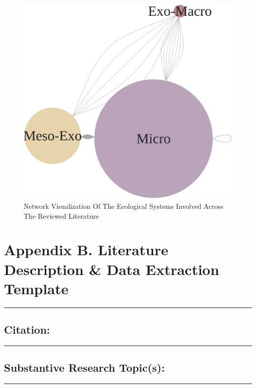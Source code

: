 \documentclass[11pt,]{tufte-book}
\newcommand{\Frule}{
    \vspace*{-1em}
    \begin{fullwidth}\textcolor{blublk}{\rule{\linewidth}{0.2mm}}\end{fullwidth}
}
\newcommand{\SFrule}[1][0.1mm]{
    \begin{fullwidth}\textcolor{blublk}{\rule{\linewidth}{#1}}\end{fullwidth}
}
\begin{document}
\begin{figure}
\centering
\includegraphics{graphics/inputs/sysnet.png}
\caption{Network Visualization Of The Ecological Systems Involved Across
The Reviewed Literature\label{fig:sysnet}}
\end{figure}

\newpage

\chapter{Appendix B. Literature Description \& Data Extraction
Template}\label{appendix-b.-literature-description-data-extraction-template}

\Frule

\section{Citation:}\label{citation}

\tufteskip

\SFrule

\section{Substantive Research
Topic(s):}\label{substantive-research-topics-1}

\tufteskip

\SFrule
\end{document}
